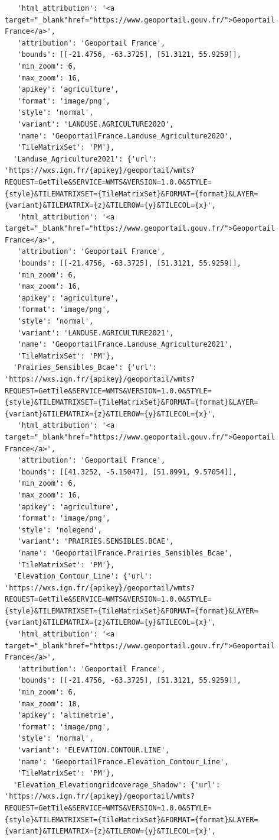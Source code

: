 \documentclass[
  letterpaper,
  DIV=11,
  numbers=noendperiod]{scrreprt}
\begin{document}
\begin{verbatim}
   'html_attribution': '<a target="_blank"href="https://www.geoportail.gouv.fr/">Geoportail France</a>',
   'attribution': 'Geoportail France',
   'bounds': [[-21.4756, -63.3725], [51.3121, 55.9259]],
   'min_zoom': 6,
   'max_zoom': 16,
   'apikey': 'agriculture',
   'format': 'image/png',
   'style': 'normal',
   'variant': 'LANDUSE.AGRICULTURE2020',
   'name': 'GeoportailFrance.Landuse_Agriculture2020',
   'TileMatrixSet': 'PM'},
  'Landuse_Agriculture2021': {'url': 'https://wxs.ign.fr/{apikey}/geoportail/wmts?REQUEST=GetTile&SERVICE=WMTS&VERSION=1.0.0&STYLE={style}&TILEMATRIXSET={TileMatrixSet}&FORMAT={format}&LAYER={variant}&TILEMATRIX={z}&TILEROW={y}&TILECOL={x}',
   'html_attribution': '<a target="_blank"href="https://www.geoportail.gouv.fr/">Geoportail France</a>',
   'attribution': 'Geoportail France',
   'bounds': [[-21.4756, -63.3725], [51.3121, 55.9259]],
   'min_zoom': 6,
   'max_zoom': 16,
   'apikey': 'agriculture',
   'format': 'image/png',
   'style': 'normal',
   'variant': 'LANDUSE.AGRICULTURE2021',
   'name': 'GeoportailFrance.Landuse_Agriculture2021',
   'TileMatrixSet': 'PM'},
  'Prairies_Sensibles_Bcae': {'url': 'https://wxs.ign.fr/{apikey}/geoportail/wmts?REQUEST=GetTile&SERVICE=WMTS&VERSION=1.0.0&STYLE={style}&TILEMATRIXSET={TileMatrixSet}&FORMAT={format}&LAYER={variant}&TILEMATRIX={z}&TILEROW={y}&TILECOL={x}',
   'html_attribution': '<a target="_blank"href="https://www.geoportail.gouv.fr/">Geoportail France</a>',
   'attribution': 'Geoportail France',
   'bounds': [[41.3252, -5.15047], [51.0991, 9.57054]],
   'min_zoom': 6,
   'max_zoom': 16,
   'apikey': 'agriculture',
   'format': 'image/png',
   'style': 'nolegend',
   'variant': 'PRAIRIES.SENSIBLES.BCAE',
   'name': 'GeoportailFrance.Prairies_Sensibles_Bcae',
   'TileMatrixSet': 'PM'},
  'Elevation_Contour_Line': {'url': 'https://wxs.ign.fr/{apikey}/geoportail/wmts?REQUEST=GetTile&SERVICE=WMTS&VERSION=1.0.0&STYLE={style}&TILEMATRIXSET={TileMatrixSet}&FORMAT={format}&LAYER={variant}&TILEMATRIX={z}&TILEROW={y}&TILECOL={x}',
   'html_attribution': '<a target="_blank"href="https://www.geoportail.gouv.fr/">Geoportail France</a>',
   'attribution': 'Geoportail France',
   'bounds': [[-21.4756, -63.3725], [51.3121, 55.9259]],
   'min_zoom': 6,
   'max_zoom': 18,
   'apikey': 'altimetrie',
   'format': 'image/png',
   'style': 'normal',
   'variant': 'ELEVATION.CONTOUR.LINE',
   'name': 'GeoportailFrance.Elevation_Contour_Line',
   'TileMatrixSet': 'PM'},
  'Elevation_Elevationgridcoverage_Shadow': {'url': 'https://wxs.ign.fr/{apikey}/geoportail/wmts?REQUEST=GetTile&SERVICE=WMTS&VERSION=1.0.0&STYLE={style}&TILEMATRIXSET={TileMatrixSet}&FORMAT={format}&LAYER={variant}&TILEMATRIX={z}&TILEROW={y}&TILECOL={x}',

\end{verbatim}
\end{document}
